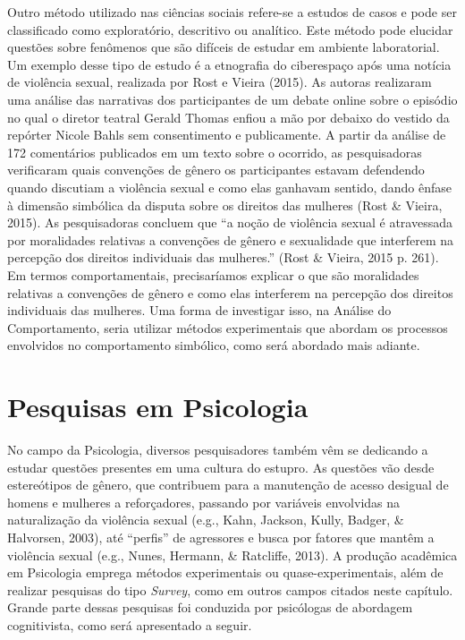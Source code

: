 Outro método utilizado nas ciências sociais refere-se a estudos de casos e pode ser classificado como exploratório, descritivo ou analítico. Este método pode elucidar questões sobre fenômenos que são difíceis de estudar em ambiente laboratorial. Um exemplo desse tipo de estudo é a etnografia do ciberespaço após uma notícia de violência sexual, realizada por Rost e Vieira (2015). As autoras realizaram uma análise das narrativas dos participantes de um debate online sobre o episódio no qual o diretor teatral Gerald Thomas enfiou a mão por debaixo do vestido da repórter Nicole Bahls sem consentimento e publicamente. A partir da análise de 172 comentários publicados em um texto sobre o ocorrido, as pesquisadoras verificaram quais convenções de gênero os participantes estavam defendendo quando discutiam a violência sexual e como elas ganhavam sentido, dando ênfase à dimensão simbólica da disputa sobre os direitos das mulheres (Rost \& Vieira, 2015). As pesquisadoras concluem que ``a noção de violência sexual é atravessada por moralidades relativas a convenções de gênero e sexualidade que interferem na percepção dos direitos individuais das mulheres.'' (Rost \& Vieira, 2015 p. 261). Em termos comportamentais, precisaríamos explicar o que são moralidades relativas a convenções de gênero e como elas interferem na percepção dos direitos individuais das mulheres. Uma forma de investigar isso, na Análise do Comportamento, seria utilizar métodos experimentais que abordam os processos envolvidos no comportamento simbólico, como será abordado mais adiante.

\section*{Pesquisas em Psicologia}

No campo da Psicologia, diversos pesquisadores também vêm se dedicando a estudar questões presentes em uma cultura do estupro. As questões vão desde estereótipos de gênero, que contribuem para a manutenção de acesso desigual de homens e mulheres a reforçadores, passando por variáveis envolvidas na naturalização da violência sexual (e.g., Kahn, Jackson, Kully, Badger, \& Halvorsen, 2003), até ``perfis'' de agressores e busca por fatores que mantêm a violência sexual (e.g., Nunes, Hermann, \& Ratcliffe, 2013). A produção acadêmica em Psicologia emprega métodos experimentais ou quase-experimentais, além de realizar pesquisas do tipo \textit{Survey}, como em outros campos citados neste capítulo. Grande parte dessas pesquisas foi conduzida por psicólogas de abordagem cognitivista, como será apresentado a seguir.

